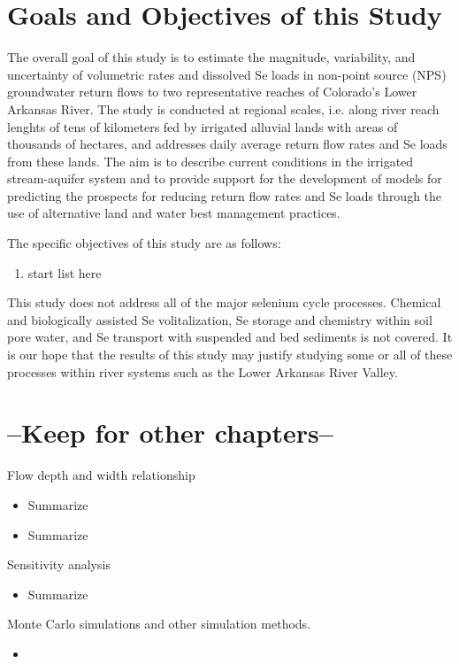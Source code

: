 \begin{linenumbers}[1]
\section{Goals and Objectives of this Study}
The overall goal of this study is to estimate the magnitude, variability, and uncertainty of volumetric rates and dissolved Se loads in non-point source (NPS) groundwater return flows to two representative reaches of Colorado's Lower Arkansas River.  The study is conducted at regional scales, i.e. along river reach lenghts of tens of kilometers fed by irrigated alluvial lands with areas of thousands of hectares, and addresses daily average return flow rates and Se loads from these lands.  The aim is to describe current conditions in the irrigated stream-aquifer system and to provide support for the development of models for predicting the prospects for reducing return flow rates and Se loads through the use of alternative land and water best management practices.

The specific objectives of this study are as follows:
\begin{enumerate}
	\item start list here
\end{enumerate}

This study does not address all of the major selenium cycle processes.  Chemical and biologically assisted Se volitalization, Se storage and chemistry within soil pore water, and Se transport with suspended and bed sediments is not covered.  It is our hope that the results of this study may justify studying some or all of these processes within river systems such as the Lower Arkansas River Valley.

\section{--Keep for other chapters--}
Flow depth and width relationship
\begin{itemize}
	\item Summarize \parencite{Gates1996}
	\item Summarize \parencite{Buhman2002}
\end{itemize}

Sensitivity analysis
\begin{itemize}
	\item Summarize \parencite{Saltelli2004}
\end{itemize} 

Monte Carlo simulations and other simulation methods.
\begin{itemize}
	\item \textcite{Spanou2001}
\end{itemize}

\end{linenumbers}
\clearpage{}